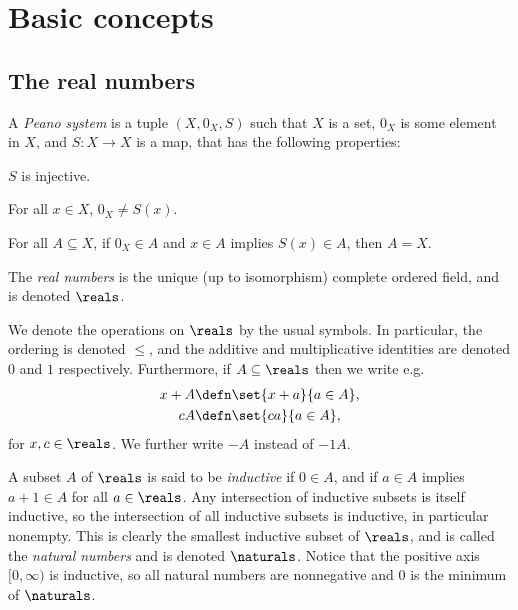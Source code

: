 \documentclass[article, a4paper, 11pt, oneside]{memoir}
\title{\doctitle}
\author{\docauthor}
\numberwithin{equation}{chapter}
\begin{document}
\maketitle


\chapter{Basic concepts}

\section{The real numbers}

\begin{definition}
    A \emph{Peano system} is a tuple $(X,0_X,S)$ such that $X$ is a set, $0_X$ is some element in $X$, and $S \colon X \to X$ is a map, that has the following properties:
    \begin{enumdef}
        \item $S$ is injective.
        \item For all $x \in X$, $0_X \neq S(x)$.
        \item For all $A \subseteq X$, if $0_X \in A$ and $x \in A$ implies $S(x) \in A$, then $A = X$.
    \end{enumdef}
\end{definition}


\begin{definition}
    The \emph{real numbers} is the unique (up to isomorphism) complete ordered field, and is denoted $\reals$.
\end{definition}
%
We denote the operations on $\reals$ by the usual symbols. In particular, the ordering is denoted $\leq$, and the additive and multiplicative identities are denoted $0$ and $1$ respectively. Furthermore, if $A \subseteq \reals$ then we write e.g.
%
\begin{align*}
    x + A
        &\defn \set{x + a}{a \in A}, \\
    cA
        &\defn \set{ca}{a \in A},
\end{align*}
%
for $x,c \in \reals$. We further write $-A$ instead of $-1A$.

A subset $A$ of $\reals$ is said to be \emph{inductive} if $0 \in A$, and if $a \in A$ implies $a + 1 \in A$ for all $a \in \reals$. Any intersection of inductive subsets is itself inductive, so the intersection of all inductive subsets is inductive, in particular nonempty. This is clearly the smallest inductive subset of $\reals$, and is called the \emph{natural numbers} and is denoted $\naturals$. Notice that the positive axis $[0,\infty)$ is inductive, so all natural numbers are nonnegative and $0$ is the minimum of $\naturals$.
\end{document}
